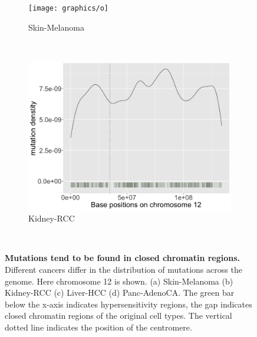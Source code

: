 \begin{figure}[htbp]
    \begin{subfigure}{.5\textwidth}
    \texttt{[image: graphics/o]}
    \caption{Skin-Melanoma}
    \label{fig:density_skin}
    \end{subfigure}
    ~
    \begin{subfigure}{.5\textwidth}
    
    \includegraphics[width=\linewidth,height=0.7\textwidth]{graphics/mutdistribution_Kidney-RCC.png}
    \caption{Kidney-RCC}
    \label{fig:density_kidney}
    \end{subfigure} \\
    \vspace{0.5cm}

    \caption{\textbf{Mutations tend to be found in closed chromatin regions.} Different cancers differ in the distribution of mutations across the genome. Here chromosome 12 is shown. (a) Skin-Melanoma (b) Kidney-RCC (c) Liver-HCC (d) Panc-AdenoCA. The green bar below the x-axis indicates hypersensitivity regions, the gap indicates closed chromatin regions of the original cell types. The vertical dotted line indicates the position of the centromere.}
    \label{fig:mutation_density}
\end{figure}